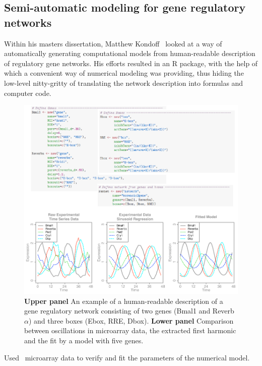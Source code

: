 \subsection{Semi-automatic modeling for gene regulatory networks}
Within his masters dissertation, Matthew
Kondoff~\cite{kondoff2015modeling} looked at a way of automatically
generating computational models from human-readable description of
regulatory gene networks. His efforts resulted in an R package, with
the help of which a convenient way of numerical modeling was
providing, thus hiding the low-level nitty-gritty of translating the
network description into formulas and computer code.

\begin{figure}
\begin{center}
\includegraphics[width=\linewidth]{figures/matt/matt.pdf}
\end{center}
\caption{
  {\bf Upper panel} An example of a human-readable description of a
  gene regulatory network consisting of two genes (Bmal1 and
  Reverb$\alpha$) and three boxes (Ebox, RRE, Dbox).
  {\bf Lower panel} Comparison between oscillations in microarray
  data, the extracted first harmonic and the fit by a model with five
  genes.
\label{fig::matt}
}
\end{figure}


Used~\cite{zhang2014circadian} microarray data to verify and fit the
parameters of the numerical model.

